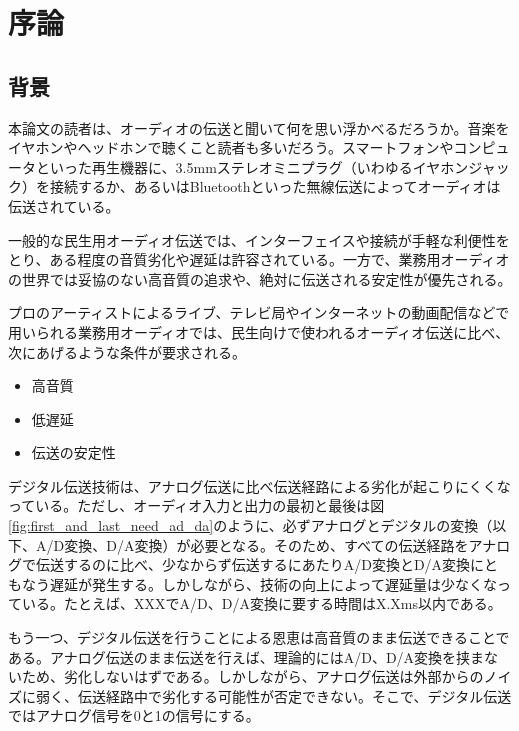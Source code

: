 \chapter{序論}
\label{chap:introduction}

\section{背景}
\label{section:background}

本論文の読者は、オーディオの伝送と聞いて何を思い浮かべるだろうか。音楽をイヤホンやヘッドホンで聴くこと読者も多いだろう。スマートフォンやコンピュータといった再生機器に、3.5mmステレオミニプラグ（いわゆるイヤホンジャック）を接続するか、あるいはBluetoothといった無線伝送によってオーディオは伝送されている。

一般的な民生用オーディオ伝送では、インターフェイスや接続が手軽な利便性をとり、ある程度の音質劣化や遅延は許容されている。一方で、業務用オーディオの世界では妥協のない高音質の追求や、絶対に伝送される安定性が優先される。

プロのアーティストによるライブ、テレビ局やインターネットの動画配信などで用いられる業務用オーディオでは、民生向けで使われるオーディオ伝送に比べ、次にあげるような条件が要求される。

\begin{itemize}
  \item 高音質
  \item 低遅延
  \item 伝送の安定性
\end{itemize}

デジタル伝送技術は、アナログ伝送に比べ伝送経路による劣化が起こりにくくなっている。ただし、オーディオ入力と出力の最初と最後は図\ref{fig:first_and_last_need_ad_da}のように、必ずアナログとデジタルの変換（以下、A/D変換、D/A変換）が必要となる。そのため、すべての伝送経路をアナログで伝送するのに比べ、少なからず伝送するにあたりA/D変換とD/A変換にともなう遅延が発生する。しかしながら、技術の向上によって遅延量は少なくなっている。たとえば、XXXでA/D、D/A変換に要する時間はX.Xms以内である。

もう一つ、デジタル伝送を行うことによる恩恵は高音質のまま伝送できることである。アナログ伝送のまま伝送を行えば、理論的にはA/D、D/A変換を挟まないため、劣化しないはずである。しかしながら、アナログ伝送は外部からのノイズに弱く、伝送経路中で劣化する可能性が否定できない。そこで、デジタル伝送ではアナログ信号を0と1の信号にする。

